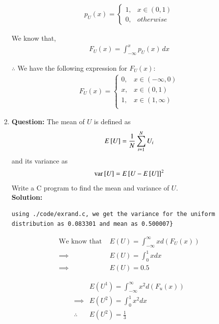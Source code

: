 \documentclass[journal,12pt,twocolumn]{IEEEtran}
\begin{document}
\begin{enumerate}[label=\thesection.\arabic*,ref=\thesection.\theenumi]
\begin{align}
	p_U(x) =
            \begin{cases}
    		1, & x \in (0, 1) \\
    		0, & otherwise
	    \end{cases}
    	\label{eq:PDF}
\end{align}

We know that,
\begin{align}
    F_U(x) = \int_{-\infty}^{x} p_U(x) \,dx
    \label{eq:Relation}
\end{align}

\noindent $\therefore$ We have the following expression for $F_U(x)$:
\begin{align}
    F_U(x) =
	    \begin{cases}
	    	0, & x \in (-\infty, 0) \\
  	    	x, & x \in (0, 1) \\
    		1, & x \in (1, \infty)\\
            \end{cases}
\end{align}


\item\textbf{Question:} The mean of $U$ is defined as
%
\begin{align}
E{}\left[U\right] = \frac{1}{N}\sum_{i=1}^{N}U_i
\end{align}
%
and its variance as
%
\begin{align}
\text{var}{}\left[U\right] = E{}\left[U- E{}\left[U\right]\right]^2 
\end{align}
Write a C program to  find the mean and variance of $U$.\\ 


\noindent \textbf{Solution:}\\
 \begin{lstlisting}
using ./code/exrand.c, we get the variance for the uniform distribution as 0.083301 and mean as 0.500007}
    \end{lstlisting}
    \begin{align}
    \text{We know that }&E(U) = \int _ {-\infty} ^ {\infty} {x d(F_U(x))}\\
    \implies &E(U) = \int _ {0} ^ {1} {x dx}\\
    \implies &E(U) = 0.5
\end{align}

\begin{align}
    &E(U^1) = \int _ {- \infty} ^ {\infty} {x^2 d(F_u(x))} \\
    \implies &E(U^2) = \int _ {0} ^ {1} {x^2 dx} \\
    \therefore &E(U^2) = \frac{1}{3}
\end{align}


\end{enumerate}
\end{document}
